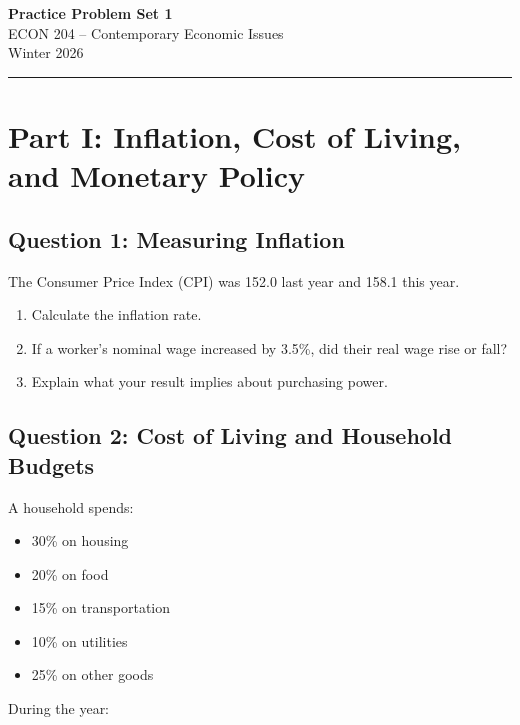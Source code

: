 \documentclass[11pt]{article}
\begin{document}
\begin{center}
{\Large \textbf{Practice Problem Set 1}}\\
\vspace{1em}
{\large ECON 204 -- Contemporary Economic Issues}\\
\vspace{1em}
{\large Winter 2026}
\end{center}
\hrule
\vspace{1em}

\section*{Part I: Inflation, Cost of Living, and Monetary Policy}

\subsection*{Question 1: Measuring Inflation}

The Consumer Price Index (CPI) was 152.0 last year and 158.1 this year.

\begin{enumerate}
\item Calculate the inflation rate.
\item If a worker’s nominal wage increased by 3.5\%, did their real wage rise or fall?
\item Explain what your result implies about purchasing power.
\end{enumerate}


\subsection*{Question 2: Cost of Living and Household Budgets}

A household spends:

\begin{itemize}
\item 30\% on housing
\item 20\% on food
\item 15\% on transportation
\item 10\% on utilities
\item 25\% on other goods
\end{itemize}

During the year:
\end{document}
